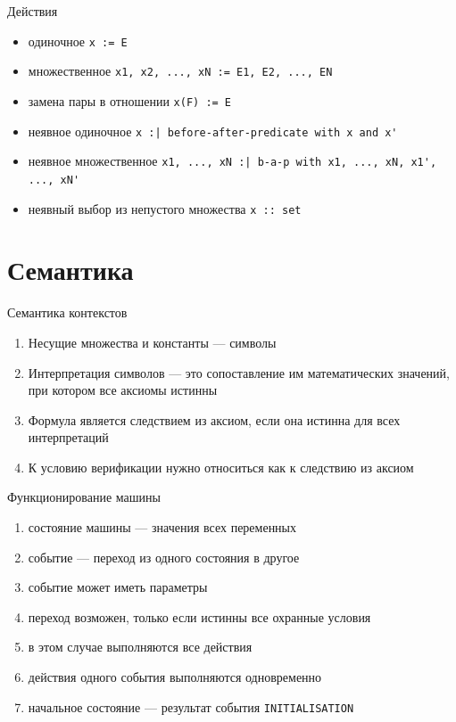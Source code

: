 \documentclass[hyperref={unicode=true}]{beamer}
\begin{document}
	\begin{frame}[fragile]{Действия}
		\begin{itemize}
			\item одиночное \verb|x := E|
			\item множественное \verb|x1, x2, ..., xN := E1, E2, ..., EN|
			\item замена пары в отношении \verb|x(F) := E|
			\item неявное одиночное  \verb`x :| before-after-predicate with x and x'`
			\item неявное множественное
			      \verb`x1, ..., xN :| b-a-p with x1, ..., xN, x1', ..., xN'`
			\item неявный выбор из непустого множества \verb`x :: set`
		\end{itemize}
	\end{frame}

	\section{Семантика}

    \begin{frame}{Семантика контекстов}
        \begin{enumerate}
            \item Несущие множества и константы --- символы
            \item Интерпретация символов --- это сопоставление им
                    математических значений, при котором все
                    аксиомы истинны
            \item Формула является следствием из аксиом, если
                    она истинна для всех интерпретаций
            \item К условию верификации нужно относиться как
                    к следствию из аксиом 
        \end{enumerate}
    \end{frame}

	\begin{frame}{Функционирование машины}
		\begin{enumerate}
			\item состояние машины --- значения всех переменных
			\item событие --- переход из одного состояния в другое
			\item событие может иметь параметры
			\item переход возможен, только если истинны
			      все охранные условия
			\item в этом случае выполняются все действия
			\item действия одного события выполняются одновременно
			\item начальное состояние --- результат события \texttt{INITIALISATION}
		\end{enumerate}
	\end{frame}
\end{document}
